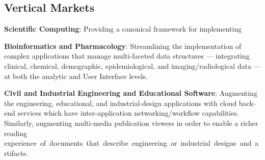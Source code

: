 
\begin{frame}{}
\section{Vertical Markets}

\vspace{-3pt}
{\thrulex}

{\fontsize{17}{22}\selectfont
\hspace*{3pt}\begin{minipage}{.97\textwidth}
\vspace{-6pt}



		

{\setlength{\leftmargini}{3pt}\begin{enumerate}
\dmitem \textbf{Scientific Computing}: \hspace{.25em} 
Providing a canonical framework for 
implementing \vspace{11pt}

\dmitem \textbf{Bioinformatics and Pharmacology}:  \hspace{.25em} 
Streamlining 
the implementation of complex applications 
that manage multi-faceted data structures 
--- integrating 
clinical, chemical, demographic, epidemiological, 
and imaging/radiological data --- 
at both the analytic and User Interface 
levels.    
\vspace{11pt}


\dmitem \textbf{Civil and Industrial Engineering and 
Educational Software}:  \hspace{.25em} 
Augmenting the engineering, educational, and 
industrial-design applications with cloud back-end 
services which have inter-application 
networking/workflow capabilities.  Similarly, 
augmenting multi-media publication viewers in 
order to enable a richer reading 
\mbox{experience of documents that 
describe engineering or industrial 
designs and artifacts.}


\end{enumerate}}
\end{minipage}}
\end{frame}
